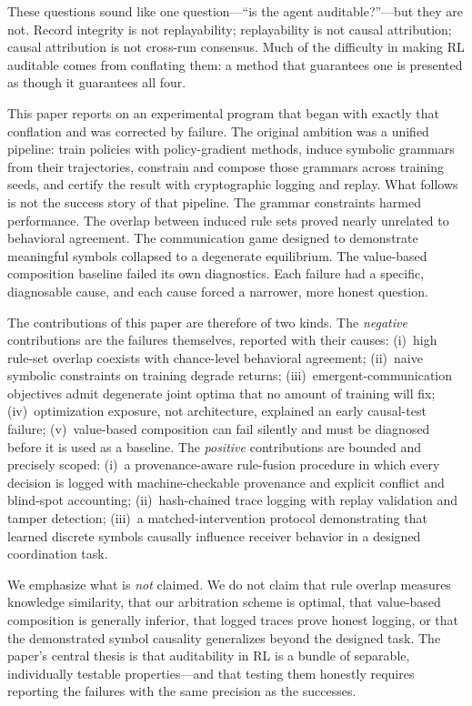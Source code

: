 \documentclass[11pt]{article}
\begin{document}
These questions sound like one question---``is the agent auditable?''---but they are not. Record integrity is not replayability; replayability is not causal attribution; causal attribution is not cross-run consensus. Much of the difficulty in making RL auditable comes from conflating them: a method that guarantees one is presented as though it guarantees all four.

This paper reports on an experimental program that began with exactly that conflation and was corrected by failure. The original ambition was a unified pipeline: train policies with policy-gradient methods, induce symbolic grammars from their trajectories, constrain and compose those grammars across training seeds, and certify the result with cryptographic logging and replay. What follows is not the success story of that pipeline. The grammar constraints harmed performance. The overlap between induced rule sets proved nearly unrelated to behavioral agreement. The communication game designed to demonstrate meaningful symbols collapsed to a degenerate equilibrium. The value-based composition baseline failed its own diagnostics. Each failure had a specific, diagnosable cause, and each cause forced a narrower, more honest question.

The contributions of this paper are therefore of two kinds. The \textit{negative} contributions are the failures themselves, reported with their causes: (i)~high rule-set overlap coexists with chance-level behavioral agreement; (ii)~naive symbolic constraints on training degrade returns; (iii)~emergent-communication objectives admit degenerate joint optima that no amount of training will fix; (iv)~optimization exposure, not architecture, explained an early causal-test failure; (v)~value-based composition can fail silently and must be diagnosed before it is used as a baseline. The \textit{positive} contributions are bounded and precisely scoped: (i)~a provenance-aware rule-fusion procedure in which every decision is logged with machine-checkable provenance and explicit conflict and blind-spot accounting; (ii)~hash-chained trace logging with replay validation and tamper detection; (iii)~a matched-intervention protocol demonstrating that learned discrete symbols causally influence receiver behavior in a designed coordination task.

We emphasize what is \textit{not} claimed. We do not claim that rule overlap measures knowledge similarity, that our arbitration scheme is optimal, that value-based composition is generally inferior, that logged traces prove honest logging, or that the demonstrated symbol causality generalizes beyond the designed task. The paper's central thesis is that auditability in RL is a bundle of separable, individually testable properties---and that testing them honestly requires reporting the failures with the same precision as the successes.
\end{document}
